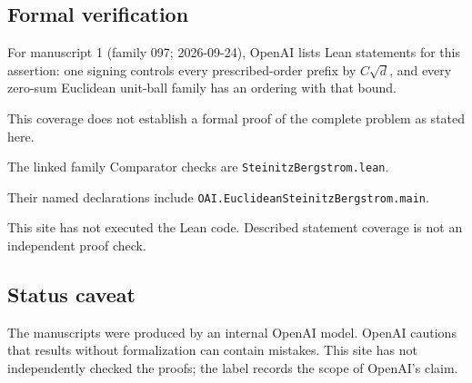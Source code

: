 \documentclass[11pt]{article}
\begin{document}
\subsection{Formal verification}
For manuscript 1 (family 097; 2026-09-24), OpenAI lists Lean statements for this assertion: one signing controls every prescribed-order prefix by $C\sqrt d$, and every zero-sum Euclidean unit-ball family has an ordering with that bound.

This coverage does not establish a formal proof of the complete problem as stated here.

The linked family Comparator checks are \texttt{SteinitzBergstrom.lean}.

Their named declarations include \texttt{OAI.EuclideanSteinitzBergstrom.main}.

This site has not executed the Lean code. Described statement coverage is not an independent proof check.

\subsection{Status caveat}
The manuscripts were produced by an internal OpenAI model. OpenAI cautions that results without formalization can contain mistakes. This site has not independently checked the proofs; the label records the scope of OpenAI's claim.
\end{document}
